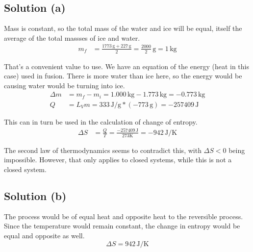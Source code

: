 \documentclass[12pt]{article}
\begin{document}
        \subsection{Solution (a)}
            Mass is constant, so the total mass of the water and ice will be equal, itself the average of the total massses of ice and water.
            \begin{align}
                m_f &=  \frac{1773\,\unit{\gram} + 227\,\unit{\gram}}{2}
                    =   \frac{2000}{2}\,\unit{\gram}
                    =   1\,\unit{\kilo\gram}
            \end{align}

            That's a convenient value to use.
            We have an equation of the energy (heat in this case) used in fusion. 
            There is more water than ice here, so the energy would be causing water would be turning into ice.
            \begin{align}
                \Delta m    &=  m_f - m_i
                    =   1.000\,\unit{\kilo\gram} - 1.773\,\unit{\kilo\gram}
                    =   -0.773\,\unit{\kilo\gram}\\
                Q   &=  L_V m
                    =   333\,\unit{\joule/\gram} * (-773\,\unit{\gram})
                    =   -257409\,\unit{\joule}
            \end{align}

            This can in turn be used in the calculation of change of entropy.
            \begin{align}
                \Delta S    &=  \frac{Q}{T}
                    =   \frac{-257409\,\unit{\joule}}{273\unit{\kelvin}}
                    =   \boxed{-942\,\unit{\joule/\kelvin}}
            \end{align}

            The second law of thermodynamics seems to contradict this, with $\Delta S < 0$ being impossible.
            However, that only applies to closed systems, while this is not a closed system.

        \subsection{Solution (b)}
            The process would be of equal heat and opposite heat to the reversible process.
            Since the temperature would remain constant, the change in entropy would be equal and opposite as well.
            \begin{equation}
                \Delta S    =   \boxed{942\,\unit{\joule/\kelvin}}
            \end{equation}
\end{document}
